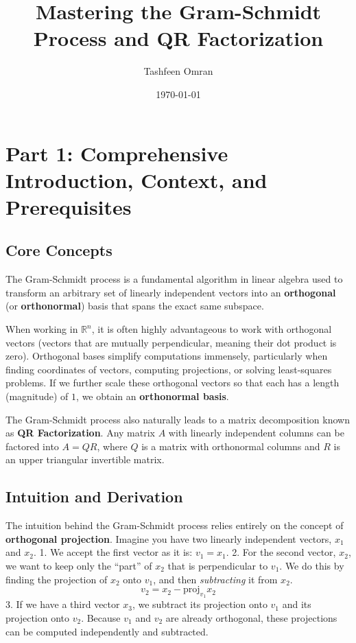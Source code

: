 \documentclass[11pt, letterpaper]{article}
\theoremstyle{definition}
\theoremstyle{remark}
\newcommand{\R}{\mathbb{R}}
\begin{document}
\title{\textbf{Mastering the Gram-Schmidt Process and QR Factorization}}
\author{Tashfeen Omran}
\date{\today}
\maketitle

\tableofcontents
\newpage

\section{Part 1: Comprehensive Introduction, Context, and Prerequisites}

\subsection{Core Concepts}
The Gram-Schmidt process is a fundamental algorithm in linear algebra used to transform an arbitrary set of linearly independent vectors into an \textbf{orthogonal} (or \textbf{orthonormal}) basis that spans the exact same subspace. 

When working in $\R^n$, it is often highly advantageous to work with orthogonal vectors (vectors that are mutually perpendicular, meaning their dot product is zero). Orthogonal bases simplify computations immensely, particularly when finding coordinates of vectors, computing projections, or solving least-squares problems. If we further scale these orthogonal vectors so that each has a length (magnitude) of $1$, we obtain an \textbf{orthonormal basis}.

The Gram-Schmidt process also naturally leads to a matrix decomposition known as \textbf{QR Factorization}. Any matrix $A$ with linearly independent columns can be factored into $A = QR$, where $Q$ is a matrix with orthonormal columns and $R$ is an upper triangular invertible matrix.

\subsection{Intuition and Derivation}
The intuition behind the Gram-Schmidt process relies entirely on the concept of \textbf{orthogonal projection}. 
Imagine you have two linearly independent vectors, $x_1$ and $x_2$. 
1. We accept the first vector as it is: $v_1 = x_1$.
2. For the second vector, $x_2$, we want to keep only the ``part'' of $x_2$ that is perpendicular to $v_1$. We do this by finding the projection of $x_2$ onto $v_1$, and then \textit{subtracting} it from $x_2$. 
\[ v_2 = x_2 - \text{proj}_{v_1} x_2 \]
3. If we have a third vector $x_3$, we subtract its projection onto $v_1$ and its projection onto $v_2$. Because $v_1$ and $v_2$ are already orthogonal, these projections can be computed independently and subtracted.
\end{document}
